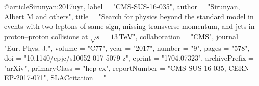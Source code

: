 

@article{Sirunyan:2017uyt,
      label          = "CMS-SUS-16-035",
      author         = "Sirunyan, Albert M and others",
      title          = "{Search for physics beyond the standard model in events
                        with two leptons of same sign, missing transverse
                        momentum, and jets in proton--proton collisions at
                        $\sqrt{s} = 13\,\text {TeV} $}",
      collaboration  = "CMS",
      journal        = "Eur. Phys. J.",
      volume         = "C77",
      year           = "2017",
      number         = "9",
      pages          = "578",
      doi            = "10.1140/epjc/s10052-017-5079-z",
      eprint         = "1704.07323",
      archivePrefix  = "arXiv",
      primaryClass   = "hep-ex",
      reportNumber   = "CMS-SUS-16-035, CERN-EP-2017-071",
      SLACcitation   = "%
}

